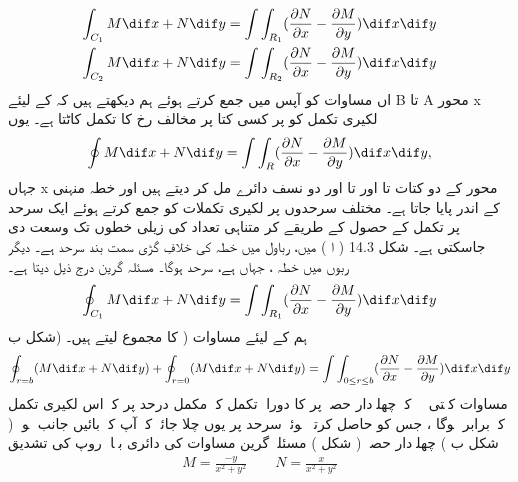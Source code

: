 \begin{align}
\int_{C_1} M \dif x + N \dif y &= \int \int_{R_1} (\frac{\partial N}{\partial x} - \frac{\partial M}{\partial y}) \dif x \dif y \\     \int_{C_2} M \dif x + N \dif y &= \int \int_{R_2} (\frac{\partial N}{\partial x} - \frac{\partial M}{\partial y}) \dif x \dif y 
\end{align}
 اں مساوات کو آپس میں جمع کرتے ہوئے ہم دیکھتے ہیں کہ   کے لیئے B تا  A محور x لکیری تکمل کو  پر کسی کتا پر مخالف رخ کا تکمل کاٹتا ہے۔ یوں  
\begin{align}
     \oint M \dif x + N \dif y = \int \int_R (\frac{\partial N}{\partial x} - \frac{\partial M}{\partial y}) \dif x \dif y, 
\end{align}
 جہاں  x محور کے دو کتات   تا  اور  تا  اور دو نسف دائرے مل کر  دیتے ہیں اور خطہ   منہنی   کے اندر پایا جاتا ہے۔  مختلف سرحدوں پر لکیری تکملات کو جمع کرتے ہوئے ایک سرحد پر تکمل کے حصول کے طریقے کر متناہی تعداد کی زیلی خطوں تک وسعت دی جاسکتی ہے۔ شکل 14.3 ( ا ) میں، رباول میں خطہ   کی خلافِ گڑی سمت بند سرحد   ہے۔ دیگر ربوں میں    خطہ  ، جہاں   ہے، سرحد ہوگا۔ مسئلہ  گرین درج ذیل دیتا ہے۔ 
\begin{align}
     \oint_{C_1} M \dif x + N \dif y = \int \int_{R_1} (\frac{\partial N}{\partial x} -  \frac{\partial M}{\partial y}) \dif x \dif y 
\end{align}
 ہم  کے لیئے  مساوات     ( کا مجموع لیتے ہیں۔ (شکل     ب 
\begin{align}
     \oint_{r=b} (M \dif x + N \dif y) + \oint_{r=0} (M \dif x + N \dif y) = \int \int_{0\leq r \leq b} (\frac{\partial N}{\partial x} -  \frac{\partial M}{\partial y}) \dif x \dif y 
\end{align}
 مساوات      کہتی ہے کہ چھلےدار حصہ   پر   کا دوراہ تکمل   کے مکمل درحد پر  کے اس لکیری تکمل کے برابر ہوگا ، جس کو حاصل کرتے ہوئے سرحد پر یوں چلا جائے کہ   آپ کے بائیں جانب ہو۔ ( شکل      ب   )  
 چھلےدار حصہ   ( شکل    ) مسئلہ  گرین مساوات      کی دائری بہاوؑ روپ کی تشدیق 
\begin{align*}
  M = \frac{-y}{x^2 + y^2} \quad\quad N=\frac{x}{x^2 + y^2}  
\end{align*}
